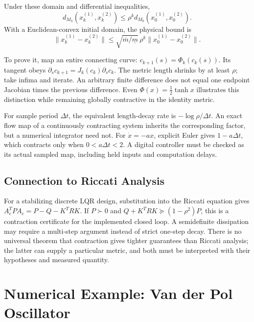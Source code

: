 \begin{theorem}
\label{thm:ch4:discrete-contraction}
Under these domain and differential inequalities,
\begin{equation}
d_{M_k}(x_k^{(1)},x_k^{(2)})\leq\rho^k d_{M_0}(x_0^{(1)},x_0^{(2)}).
\label{eq:ch4:discrete-geodesic-decay}
\end{equation}
With a Euclidean-convex initial domain, the physical bound is
\begin{equation}
\|x_k^{(1)}-x_k^{(2)}\|\leq\sqrt{\overline m/\underline m}\,
\rho^k\|x_0^{(1)}-x_0^{(2)}\|.
\label{eq:ch4:discrete-euclidean-decay}
\end{equation}
\end{theorem}

To prove it, map an entire connecting curve: $c_{k+1}(s)=\Phi_k(c_k(s))$. Its tangent obeys $\partial_sc_{k+1}=J_k(c_k)\partial_sc_k$. The metric length shrinks by at least $\rho$; take infima and iterate. An arbitrary finite difference does not equal one endpoint Jacobian times the previous difference. Even $\Phi(x)=\tfrac12\tanh x$ illustrates this distinction while remaining globally contractive in the identity metric.

For sample period $\Delta t$, the equivalent length-decay rate is $-\log\rho/\Delta t$. An exact flow map of a continuously contracting system inherits the corresponding factor, but a numerical integrator need not. For $\dot x=-ax$, explicit Euler gives $1-a\Delta t$, which contracts only when $0<a\Delta t<2$. A digital controller must be checked as its actual sampled map, including held inputs and computation delays.

\subsection{Connection to Riccati Analysis}

For a stabilizing discrete LQR design, substitution into the Riccati equation gives
$A_c^TPA_c=P-Q-K^TRK$.
If $P\succ0$ and $Q+K^TRK\succeq(1-\rho^2)P$, this is a contraction certificate for the implemented closed loop. A semidefinite dissipation may require a multi-step argument instead of strict one-step decay. There is no universal theorem that contraction gives tighter guarantees than Riccati analysis; the latter can supply a particular metric, and both must be interpreted with their hypotheses and measured quantity.

\section{Numerical Example: Van der Pol Oscillator}
\label{sec:ch4:vdp}

